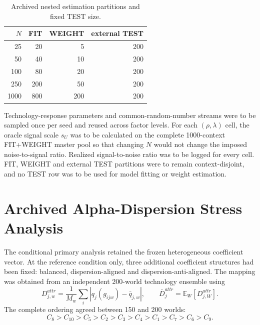\documentclass[runningheads]{llncs}
\newcommand{\E}{\mathbb{E}}
\begin{document}
\begin{table}[t]
\centering
\caption{Archived nested estimation partitions and fixed TEST size.}
\label{supp:tab:partitions}
\small
\begin{tabular}{@{}rrrr@{}}
\toprule
$N$ & FIT & WEIGHT & external TEST\\
\midrule
25 & 20 & 5 & 200\\
50 & 40 & 10 & 200\\
100 & 80 & 20 & 200\\
250 & 200 & 50 & 200\\
1000 & 800 & 200 & 200\\
\bottomrule
\end{tabular}
\end{table}

Technology-response parameters and common-random-number streams were to be sampled once per
seed and reused across factor levels. For each $(\rho,\lambda)$ cell, the oracle signal scale
$s_U$ was to be calculated on the complete 1000-context FIT+WEIGHT master pool so that changing
$N$ would not change the imposed noise-to-signal ratio. Realized signal-to-noise ratio was to
be logged for every cell. FIT, WEIGHT and external TEST partitions were to remain
context-disjoint, and no TEST row was to be used for model fitting or weight estimation.

\section{Archived Alpha-Dispersion Stress Analysis}

The conditional primary analysis retained the frozen heterogeneous coefficient vector. At the
reference condition only, three additional coefficient structures had been fixed: balanced,
dispersion-aligned and dispersion-anti-aligned. The mapping was obtained from an independent
200-world technology ensemble using
\begin{equation}
D_{j,w}^{attr}
=\frac{1}{M_w}\sum_i\left|q_j(g_{ijw})-\bar q_{j,w}\right|,
\qquad
\bar D_j^{attr}=\E_W[D_{j,W}^{attr}].
\label{supp:eq:qmad}
\end{equation}
The complete ordering agreed between 150 and 200 worlds:
\begin{equation}
C_8>C_{10}>C_5>C_2>C_3>C_4>C_1>C_7>C_6>C_9.
\label{supp:eq:d3order}
\end{equation}
\end{document}
